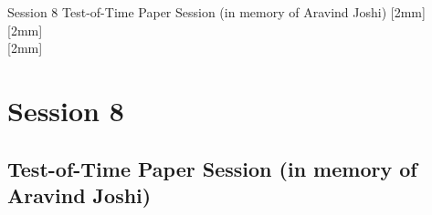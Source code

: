 \clearpage
{}
\begin{OneSessionOverview}{Session 8}{\daydateyear}
  {Test-of-Time Paper Session (in memory of Aravind Joshi)}
  {\TrackBLoc}
  [2mm]
  \\
  \hline
  [2mm]
  \\
  \hline
  [2mm]
  \\
  \hline
\end{OneSessionOverview}

\newpage
\section*{Session 8}
\subsection{Test-of-Time Paper Session (in memory of Aravind Joshi)}
\TrackBLoc\hfill{}
\clearpage


